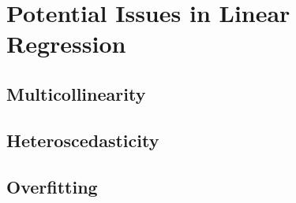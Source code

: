 \documentclass[11pt]{article}
\begin{document}
\section{Potential Issues in Linear Regression}


\subsection{Multicollinearity}


\subsection{Heteroscedasticity}


\subsection{Overfitting}
\end{document}
